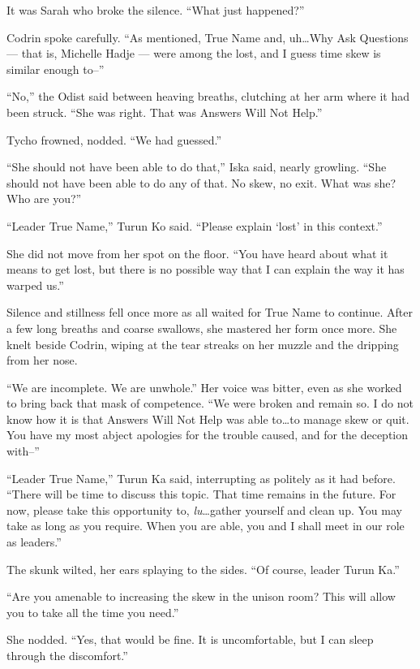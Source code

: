 It was Sarah who broke the silence. ``What just happened?''

Codrin spoke carefully. ``As mentioned, True Name and, uh\ldots Why Ask Questions — that is, Michelle Hadje — were among the lost, and I guess time skew is similar enough to--''

``No,'' the Odist said between heaving breaths, clutching at her arm where it had been struck. ``She was right. That was Answers Will Not Help.''

Tycho frowned, nodded. ``We had guessed.''

``She should not have been able to do that,'' Iska said, nearly growling. ``She should not have been able to do any of that. No skew, no exit. What was she? Who are you?''

``Leader True Name,'' Turun Ko said. ``Please explain `lost' in this context.''

She did not move from her spot on the floor. ``You have heard about what it means to get lost, but there is no possible way that I can explain the way it has warped us.''

Silence and stillness fell once more as all waited for True Name to continue. After a few long breaths and coarse swallows, she mastered her form once more. She knelt beside Codrin, wiping at the tear streaks on her muzzle and the dripping from her nose.

``We are incomplete. We are unwhole.'' Her voice was bitter, even as she worked to bring back that mask of competence. ``We were broken and remain so. I do not know how it is that Answers Will Not Help was able to\ldots to manage skew or quit. You have my most abject apologies for the trouble caused, and for the deception with--''

``Leader True Name,'' Turun Ka said, interrupting as politely as it had before. ``There will be time to discuss this topic. That time remains in the future. For now, please take this opportunity to, \emph{lu}\ldots gather yourself and clean up. You may take as long as you require. When you are able, you and I shall meet in our role as leaders.''

The skunk wilted, her ears splaying to the sides. ``Of course, leader Turun Ka.''

``Are you amenable to increasing the skew in the unison room? This will allow you to take all the time you need.''

She nodded. ``Yes, that would be fine. It is uncomfortable, but I can sleep through the discomfort.''

